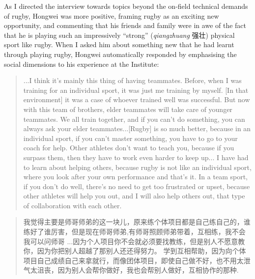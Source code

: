 \begin{CJK}{UTF8}{gbsn}
As I directed the interview towards topics beyond the on-field technical demands of rugby, Hongwei was more positive, framing rugby as an exciting new opportunity, and commenting that his friends and family were in awe of the fact that he is playing such an impressively ``strong'' (\textit{qiangzhuang} 强壮) physical sport like rugby.  When I asked him about something new that he had learnt through playing rugby, Hongwei automatically responded by emphasising the social dimensions to his experience at the Institute:

  \begin{quote}
    ...I think it's mainly this thing of having teammates. Before, when I was training for an individual sport, it was just me training by myself. [In that environment] it was a case of whoever trained well was successful.  But now with this team of brothers, elder teammates will take care of younger teammates. We all train together, and if you can’t do something, you can always ask your elder teammates...[Rugby] is so much better, because in an individual sport, if you can't master something, you have to go to your coach for help. Other athletes don't want to teach you, because if you surpass them, then they have to work even harder to keep up... I have had to learn about helping others, because rugby is not like an individual sport, where you look after your own performance and that's it.  In a team sport, if you don't do well, there's no need to get too frustrated or upset, because other athletes will help you out, and I will also help others out, that type of collaboration with each other.
  \end{quote}

\begin{CJK}{UTF8}{gbsn}
  \begin{quote}
    我觉得主要是师哥师弟的这一块儿，原来练个体项目都是自己练自己的，谁练好了谁厉害，但是现在师哥师弟,有师哥照顾师弟带着，互相练，我不会我可以问师哥
    ...因为个人项目你不会就必须要找教练，但是别人不愿意教你，因为你把别人超越了那别人还还得努力。 学到互相帮助，因为向个体项目自己成绩自己来拿就行，而像团体项目，即使自己做不好，也不用太泄气太沮丧，因为别人会帮你做好，我也会帮别人做好，互相协作的那种.
  \end{quote}
\end{CJK}


\end{CJK}
